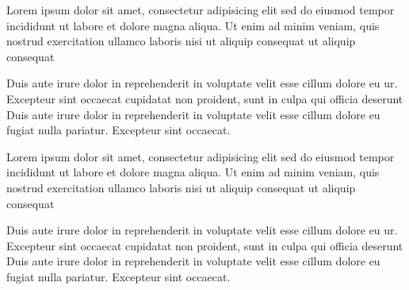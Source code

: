 \documentclass{article}
\begin{document}
\begin{pages}
\begin{Rightside}
Lorem ipsum dolor sit amet, consectetur adipisicing elit
sed do eiusmod tempor incididunt ut labore et dolore
magna aliqua. Ut enim ad minim veniam, quis nostrud
exercitation ullamco laboris nisi
ut aliquip consequat ut aliquip consequat
\pend

Duis aute irure dolor in reprehenderit
in voluptate velit esse cillum dolore eu ur. Excepteur sint occaecat
cupidatat non proident, sunt in culpa qui officia deserunt
Duis aute irure dolor in reprehenderit
in voluptate velit esse cillum dolore eu fugiat nulla
pariatur. Excepteur sint occaecat.
\pend

Lorem ipsum dolor sit amet, consectetur adipisicing elit
sed do eiusmod tempor incididunt ut labore et dolore
magna aliqua. Ut enim ad minim veniam, quis nostrud
exercitation ullamco laboris nisi
ut aliquip consequat ut aliquip consequat
\pend

Duis aute irure dolor in reprehenderit
in voluptate velit esse cillum dolore eu ur. Excepteur sint occaecat
cupidatat non proident, sunt in culpa qui officia deserunt
Duis aute irure dolor in reprehenderit
in voluptate velit esse cillum dolore eu fugiat nulla
pariatur. Excepteur sint occaecat.
\pend

\endnumbering
\end{Rightside}


\end{pages}
\Pages
\end{document}
